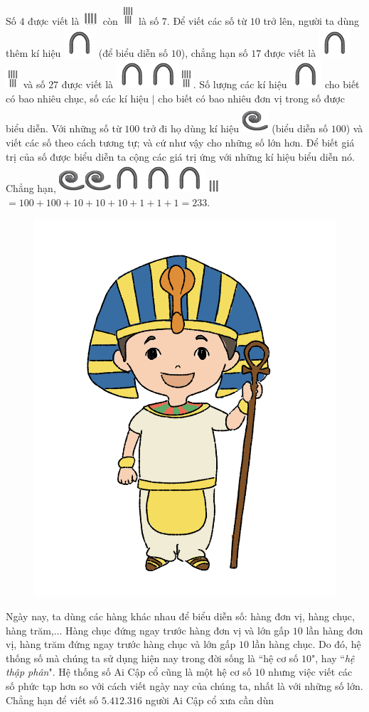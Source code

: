 	Số $4$ được viết là \includegraphics{3} còn \includegraphics{4}  là số $7$. Để viết các số từ $10$ trở lên, người ta dùng thêm kí hiệu \includegraphics{5} (để biểu diễn số $10$), chẳng hạn số $17$ được viết là \includegraphics{5}\includegraphics{4} và số $27$ được viết là  \includegraphics{5}\includegraphics{5}\includegraphics{4}. Số lượng các kí hiệu \includegraphics{5} cho biết có bao nhiêu chục, số các kí hiệu $\mid$ cho biết có bao nhiêu đơn vị trong số được biểu diễn. Với những số từ $100$ trở đi họ dùng kí hiệu \includegraphics{6} (biểu diễn số $100$) và viết các số theo cách tương tự; và cứ như vậy cho những số lớn hơn. Để biết giá trị của số được biểu diễn ta cộng các giá trị ứng với những kí hiệu biểu diễn nó. Chẳng hạn, \includegraphics{6}\includegraphics{6}\includegraphics{5}\includegraphics{5}\includegraphics{5}\includegraphics{3.1}   $=  100+ 100 + 10 + 10 + 10 + 1 + 1 + 1= 233$.
	\vskip 0.1cm
		\begin{figure}
		\centering
		\vspace*{-5pt}
		\captionsetup{labelformat= empty, justification=centering}
		\includegraphics[width=0.9\linewidth]{20.12-pi.1}
		\vspace*{-15pt}
	\end{figure}
	Ngày nay, ta dùng các hàng khác nhau để biểu diễn số: hàng đơn vị, hàng chục, hàng trăm,... Hàng chục đứng ngay trước hàng đơn vị và lớn gấp $10$ lần hàng đơn vị, hàng trăm đứng ngay trước hàng chục và lớn gấp $10$ lần hàng chục. Do đó, hệ thống số mà chúng ta sử dụng hiện nay trong đời sống là ``hệ cơ số $10$",  hay ``\textit{hệ thập phân}". Hệ thống số Ai Cập cổ cũng là một hệ cơ số $10$ nhưng việc viết các số phức tạp hơn so với cách viết ngày nay của chúng ta, nhất là với những số lớn. Chẳng hạn để viết số ${5.}412{.}316$ người Ai Cập cổ xưa cần dùn